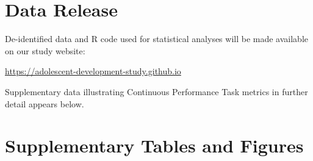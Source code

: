 \documentclass[utf8]{suppmat} %
\begin{document}
\onecolumn
{}

\title[Supplementary Material]{{}}


\maketitle

\section{Data Release}
De-identified data and R code used for statistical analyses will be made available on our study website:

\url{https://adolescent-development-study.github.io}

Supplementary data illustrating Continuous Performance Task metrics in further detail appears below. 



\section{Supplementary Tables and Figures}


\end{document}
